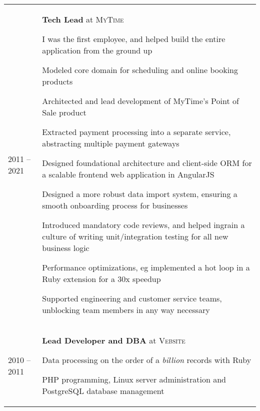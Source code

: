\documentclass[a4paper,10pt]{article}
\newenvironment{packed-list}{
  \vspace{2pt}
  \begin{itemize}[itemsep=1pt,partopsep=0pt,leftmargin=1.5em]
    \setlength{\parskip}{0pt}
    \setlength{\partopsep}{9pt}
    \setlength{\parsep}{0pt}
    \setlength{\topsep}{0pt}
} {\end{itemize}}
\begin{document}
\begin{tabular}{p{}p{}}
  \textsc{2011 – 2021}
    & \textbf{Tech Lead} at \textsc{MyTime}
    \begin{packed-list}
      \item{ I was the first employee, and helped build the entire application from the ground up }
      \item{ Modeled core domain for scheduling and online booking products }
      \item{ Architected and lead development of MyTime's Point of Sale product }
      \item{ Extracted payment processing into a separate service, abstracting multiple payment gateways }
      \item{ Designed foundational architecture and client-side ORM for a scalable frontend web application in AngularJS }
      \item{ Designed a more robust data import system, ensuring a smooth onboarding process for businesses }
      \item{ Introduced mandatory code reviews, and helped ingrain a culture of writing unit/integration testing for all new business logic }
      \item{ Performance optimizations, eg implemented a hot loop in a Ruby extension for a 30x speedup }
      \item{ Supported engineering and customer service teams, unblocking team members in any way necessary }
    \end{packed-list}
    \vspace{-5pt}
    \\
  \textsc{2010 – 2011}
    & \textbf{Lead Developer and DBA} at \textsc{Vebsite}
    \begin{packed-list}
      \item{Data processing on the order of a {\em billion} records with Ruby}
      \item{PHP programming, Linux server administration and PostgreSQL database management}
    \end{packed-list}
\end{tabular}
\vspace{-15pt}
\end{document}

